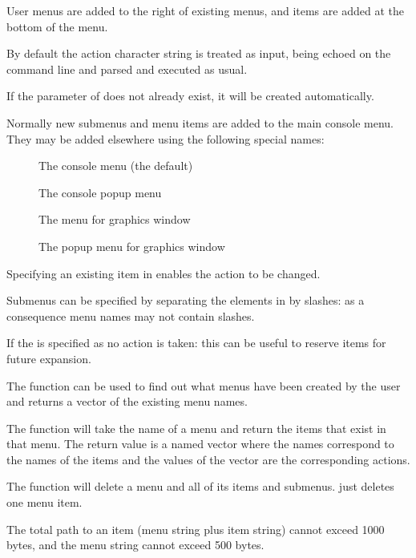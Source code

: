 \begin{Details}\relax
User menus are added to the right of existing menus, and items are
added at the bottom of the menu.

By default the action character string is treated as \R{} input, being
echoed on the command line and parsed and executed as usual.

If the  parameter of  does not
already exist, it will be created automatically.

Normally new submenus and menu items are added to the main console
menu. They may be added elsewhere using the following special names:
\begin{description}

\item[] The console menu (the default)
\item[] The console popup menu
\item[] The menu for graphics window 
\item[] The popup menu for graphics window 

\end{description}


Specifying an existing item in  enables the
action to be changed.

Submenus can be specified by separating the elements in
 by slashes: as a consequence menu names may not
contain slashes.

If the  is specified as  no action is taken:
this can be useful to reserve items for future expansion.

The function  can be used to find out what menus
have been created by the user and returns a vector of the existing
menu names.

The  function will take the name of a menu and
return the items that exist in that menu.  The return value is a named
vector where the names correspond to the names of the items and the
values of the vector are the corresponding actions.

The  function will delete a menu and all of its items
and submenus.   just deletes one menu item.

The total path to an item (menu string plus item string) cannot exceed
1000 bytes, and the menu string cannot exceed 500 bytes.
\end{Details}
